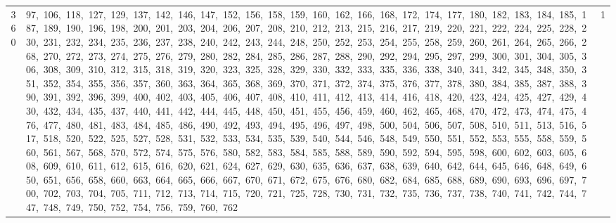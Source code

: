 \begin{longtable}{c|p{}|r}
360 & 97,\ 106,\ 118,\ 127,\ 129,\ 137,\ 142,\ 146,\ 147,\ 152,\ 156,\ 158,\ 159,\ 160,\ 162,\ 166,\ 168,\ 172,\ 174,\ 177,\ 180,\ 182,\ 183,\ 184,\ 185,\ 187,\ 189,\ 190,\ 196,\ 198,\ 200,\ 201,\ 203,\ 204,\ 206,\ 207,\ 208,\ 210,\ 212,\ 213,\ 215,\ 216,\ 217,\ 219,\ 220,\ 221,\ 222,\ 224,\ 225,\ 228,\ 230,\ 231,\ 232,\ 234,\ 235,\ 236,\ 237,\ 238,\ 240,\ 242,\ 243,\ 244,\ 248,\ 250,\ 252,\ 253,\ 254,\ 255,\ 258,\ 259,\ 260,\ 261,\ 264,\ 265,\ 266,\ 268,\ 270,\ 272,\ 273,\ 274,\ 275,\ 276,\ 279,\ 280,\ 282,\ 284,\ 285,\ 286,\ 287,\ 288,\ 290,\ 292,\ 294,\ 295,\ 297,\ 299,\ 300,\ 301,\ 304,\ 305,\ 306,\ 308,\ 309,\ 310,\ 312,\ 315,\ 318,\ 319,\ 320,\ 323,\ 325,\ 328,\ 329,\ 330,\ 332,\ 333,\ 335,\ 336,\ 338,\ 340,\ 341,\ 342,\ 345,\ 348,\ 350,\ 351,\ 352,\ 354,\ 355,\ 356,\ 357,\ 360,\ 363,\ 364,\ 365,\ 368,\ 369,\ 370,\ 371,\ 372,\ 374,\ 375,\ 376,\ 377,\ 378,\ 380,\ 384,\ 385,\ 387,\ 388,\ 390,\ 391,\ 392,\ 396,\ 399,\ 400,\ 402,\ 403,\ 405,\ 406,\ 407,\ 408,\ 410,\ 411,\ 412,\ 413,\ 414,\ 416,\ 418,\ 420,\ 423,\ 424,\ 425,\ 427,\ 429,\ 430,\ 432,\ 434,\ 435,\ 437,\ 440,\ 441,\ 442,\ 444,\ 445,\ 448,\ 450,\ 451,\ 455,\ 456,\ 459,\ 460,\ 462,\ 465,\ 468,\ 470,\ 472,\ 473,\ 474,\ 475,\ 476,\ 477,\ 480,\ 481,\ 483,\ 484,\ 485,\ 486,\ 490,\ 492,\ 493,\ 494,\ 495,\ 496,\ 497,\ 498,\ 500,\ 504,\ 506,\ 507,\ 508,\ 510,\ 511,\ 513,\ 516,\ 517,\ 518,\ 520,\ 522,\ 525,\ 527,\ 528,\ 531,\ 532,\ 533,\ 534,\ 535,\ 539,\ 540,\ 544,\ 546,\ 548,\ 549,\ 550,\ 551,\ 552,\ 553,\ 555,\ 558,\ 559,\ 560,\ 561,\ 567,\ 568,\ 570,\ 572,\ 574,\ 575,\ 576,\ 580,\ 582,\ 583,\ 584,\ 585,\ 588,\ 589,\ 590,\ 592,\ 594,\ 595,\ 598,\ 600,\ 602,\ 603,\ 605,\ 608,\ 609,\ 610,\ 611,\ 612,\ 615,\ 616,\ 620,\ 621,\ 624,\ 627,\ 629,\ 630,\ 635,\ 636,\ 637,\ 638,\ 639,\ 640,\ 642,\ 644,\ 645,\ 646,\ 648,\ 649,\ 650,\ 651,\ 656,\ 658,\ 660,\ 663,\ 664,\ 665,\ 666,\ 667,\ 670,\ 671,\ 672,\ 675,\ 676,\ 680,\ 682,\ 684,\ 685,\ 688,\ 689,\ 690,\ 693,\ 696,\ 697,\ 700,\ 702,\ 703,\ 704,\ 705,\ 711,\ 712,\ 713,\ 714,\ 715,\ 720,\ 721,\ 725,\ 728,\ 730,\ 731,\ 732,\ 735,\ 736,\ 737,\ 738,\ 740,\ 741,\ 742,\ 744,\ 747,\ 748,\ 749,\ 750,\ 752,\ 754,\ 756,\ 759,\ 760,\ 762 & 1 \\

\end{longtable}
